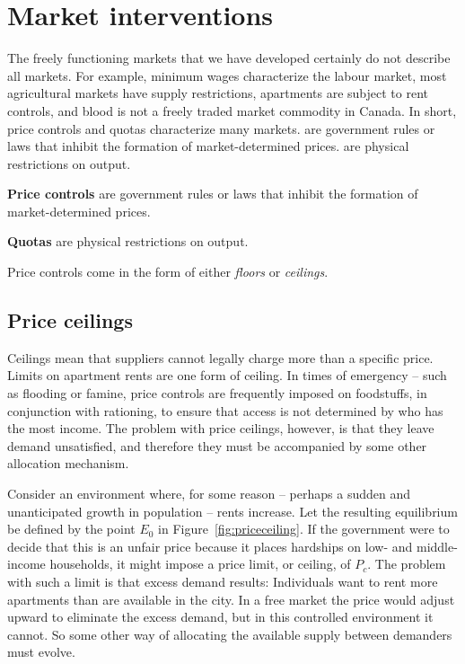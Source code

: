 \section{Market interventions}\label{sec:ch3sec7}

The freely functioning markets that we have developed certainly do not describe all markets. For example, minimum wages characterize the labour market, most agricultural markets have supply restrictions, apartments are subject to rent controls, and blood is not a freely traded market commodity in Canada. In short, price controls and quotas characterize many markets.  are government rules or laws that inhibit the formation of market-determined prices.  are physical restrictions on output. 

\begin{DefBox}
\textbf{Price controls} are government rules or laws that inhibit the formation of market-determined prices. 

\textbf{Quotas} are physical restrictions on output.
\end{DefBox}

Price controls come in the form of either \textit{floors} or \textit{ceilings}. 

\subsection*{Price ceilings}

Ceilings mean that suppliers cannot legally charge more than a specific price. Limits on apartment rents are one form of ceiling. In times of emergency -- such as flooding or famine, price controls are frequently imposed on foodstuffs, in conjunction with rationing, to ensure that access is not determined by who has the most income. The problem with price ceilings, however, is that they leave demand unsatisfied, and therefore they must be accompanied by some other allocation mechanism. 

Consider an environment where, for some reason -- perhaps a sudden and unanticipated growth in population -- rents increase. Let the resulting equilibrium be defined by the point $E_0$ in Figure~\ref{fig:priceceiling}. If the government were to decide that this is an unfair price because it places hardships on low- and middle-income households, it might impose a price limit, or ceiling, of $P_c$. The problem with such a limit is that excess demand results: Individuals want to rent more apartments than are available in the city. In a free market the price would adjust upward to eliminate the excess demand, but in this controlled environment it cannot. So some other way of allocating the available supply between demanders must evolve.

